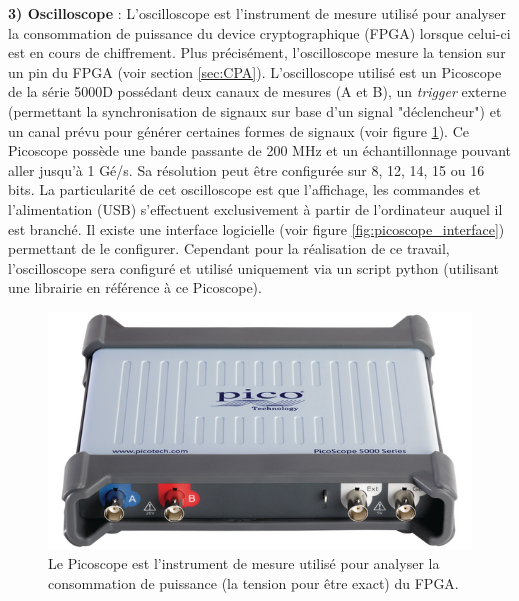 \documentclass[oneside]{book}
\begin{document}
\hspace{-0.5cm}\textbf{3) Oscilloscope} : L'oscilloscope est l'instrument de mesure utilisé pour analyser la consommation de puissance du device cryptographique (FPGA) lorsque celui-ci est en cours de chiffrement. Plus précisément, l'oscilloscope mesure la tension sur un pin du FPGA (voir section \ref{sec:CPA}). L'oscilloscope utilisé est un Picoscope de la série 5000D possédant deux canaux de mesures (A et B), un \textit{trigger} externe (permettant la synchronisation de signaux sur base d'un signal "déclencheur") et un canal prévu pour générer certaines formes de signaux (voir figure \ref{fig:picoscope}). Ce Picoscope possède une bande passante de 200 MHz et un échantillonnage pouvant aller jusqu'à 1 Gé/s. Sa résolution peut être configurée sur 8, 12, 14, 15 ou 16 bits. La particularité de cet oscilloscope est que l'affichage, les commandes et l'alimentation (USB) s'effectuent exclusivement à partir de l'ordinateur auquel il est branché. Il existe une interface logicielle (voir figure \ref{fig:picoscope_interface}) permettant de le configurer. Cependant pour la réalisation de ce travail, l'oscilloscope sera configuré et utilisé uniquement via un script python (utilisant une librairie en référence à ce Picoscope).

\begin{figure}[htbp]
    \centering
    \includegraphics[scale=0.38]{image/picoscope}
    \caption{Le Picoscope est l'instrument de mesure utilisé pour analyser la consommation de puissance (la tension pour être exact) du FPGA.}
    \label{fig:picoscope} 
\end{figure}
\end{document}
